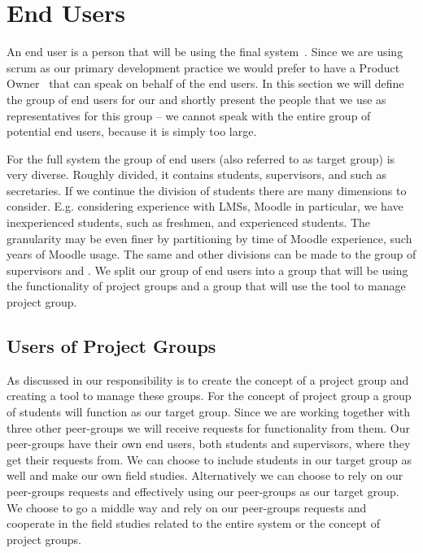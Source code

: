 \section{End Users}
\label{sec:enduser}
An end user is a person that will be using the final system~\cite{Larman04}.
Since we are using scrum as our primary development practice we would prefer to have a Product Owner~\cite{Larman04} that can speak on behalf of the end users.
In this section we will define the group of end users for our \subsystem{} and shortly present the people that we use as representatives for this group -- we cannot speak with the entire group of potential end users, because it is simply too large.

For the full system the group of end users (also referred to as target group) is very diverse.
Roughly divided, it contains students, supervisors, and \admpers{} such as secretaries.
If we continue the division of students there are many dimensions to consider. 
E.g. considering experience with LMSs, Moodle in particular, we have inexperienced students, such as freshmen, and experienced students.
The granularity may be even finer by partitioning by time of Moodle experience, such years of Moodle usage.
The same and other divisions can be made to the group of supervisors and \admpers{}.
We split our group of end users into a group that will be using the functionality of project groups and a group that will use the tool to manage project group.

\subsection{Users of Project Groups}
As discussed in  our responsibility is to create the concept of a project group and creating a tool to manage these groups.
For the concept of project group a group of students will function as our target group.
Since we are working together with three other peer-groups we will receive requests for functionality from them.
Our peer-groups have their own end users, both students and supervisors, where they get their requests from.
We can choose to include students in our target group as well and make our own field studies.
Alternatively we can choose to rely on our peer-groups requests and effectively using our peer-groups as our target group.
We choose to go a middle way and rely on our peer-groups requests and cooperate in the field studies related to the entire system or the concept of project groups.

